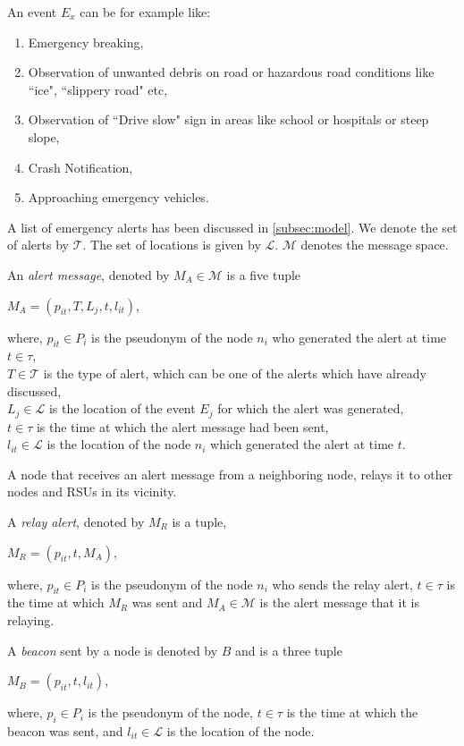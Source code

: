 \documentclass[conference]{IEEEtran}[10pt]
\begin{document}
An event $E_x$ can be for example like:
\begin{enumerate}
\item Emergency breaking,
\item Observation of unwanted debris on road or hazardous road conditions like ``ice", ``slippery road" etc,
\item Observation of ``Drive slow" sign in areas like school or hospitals or steep slope,
\item Crash Notification,
\item Approaching emergency vehicles.
\end{enumerate}
A list of emergency alerts has been discussed in \ref{subsec:model}. 
We denote the set of alerts by $\mathcal{T}$. 
The set of locations is given by $\mathcal{L}$.  
$\mathcal{M}$ denotes the message space. 

An  \emph{alert message}, denoted by $M_A \in \mathcal{M}$ is a five tuple 
\begin{center}
$M_A = (p_{it},T,L_j,t,l_{it})$, 
\end{center}
where,
$p_{it}\in P_i$ is the pseudonym of the node $n_i$ who generated the alert at time $t \in \tau$, \\
$T \in \mathcal{T}$ is the type of alert, which can be one of the alerts which have already discussed, \\
$L_j \in \mathcal{L}$ is the location of the event $E_j$ for which the alert was generated, \\
$t \in \tau$ is the time at which the alert message had been sent, \\
$l_{it} \in \mathcal{L}$ is the location of the node $n_i$ which generated the alert at time $t$.

A node that receives an alert message from a neighboring node, relays it to other nodes and RSUs in its vicinity. 


A \emph{relay alert}, denoted by $M_R$ is a  tuple, 
\begin{center}
$M_R = (p_{it},t,M_A)$,
\end{center}
where, 
$p_{it}\in P_i$ is the pseudonym of the node $n_i$ who sends the relay alert, 
$t \in \tau$ is the time at which $M_R$ was sent and 
$M_A \in \mathcal{M}$ is the alert message that it is relaying. 


A \emph{beacon} sent by a node is denoted by $B$ and is a three tuple
\begin{center}
$M_B = (p_{it}, t, l_{it})$,
\end{center}
where, 
$p_i \in P_i$ is the pseudonym of the node, 
$t \in \tau $ is the time at which the beacon was sent, and
$l_{it} \in \mathcal{L}$ is the location of the node. 
\end{document}
